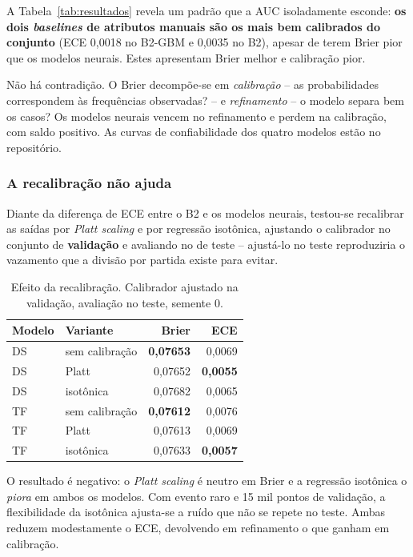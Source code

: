 \documentclass[12pt]{article}
\begin{document}
A Tabela~\ref{tab:resultados} revela um padrão que a AUC isoladamente esconde:
\textbf{os dois \emph{baselines} de atributos manuais são os mais bem calibrados
do conjunto} (ECE 0,0018 no B2-GBM e 0,0035 no B2), apesar de terem Brier pior
que os modelos neurais. Estes apresentam Brier melhor e calibração pior.

Não há contradição. O Brier decompõe-se em \emph{calibração} -- as probabilidades
correspondem às frequências observadas? -- e \emph{refinamento} -- o modelo separa
bem os casos? Os modelos neurais vencem no refinamento e perdem na calibração, com
saldo positivo. As curvas de confiabilidade dos quatro modelos estão no
repositório.

\subsubsection*{A recalibração não ajuda}

Diante da diferença de ECE entre o B2 e os modelos neurais, testou-se recalibrar
as saídas por \emph{Platt scaling} e por regressão isotônica, ajustando o
calibrador no conjunto de \textbf{validação} e avaliando no de teste --
ajustá-lo no teste reproduziria o vazamento que a divisão por partida existe
para evitar.

\begin{table}[ht]
\centering
\caption{Efeito da recalibração. Calibrador ajustado na validação, avaliação no
teste, semente 0.}
\label{tab:recal}
\begin{tabular}{@{}llrr@{}}
\toprule
Modelo & Variante & Brier & ECE \\
\midrule
DS & sem calibração & \textbf{0,07653} & 0,0069 \\
DS & Platt          & 0,07652 & \textbf{0,0055} \\
DS & isotônica      & 0,07682 & 0,0065 \\
\midrule
TF & sem calibração & \textbf{0,07612} & 0,0076 \\
TF & Platt          & 0,07613 & 0,0069 \\
TF & isotônica      & 0,07633 & \textbf{0,0057} \\
\bottomrule
\end{tabular}
\end{table}

O resultado é negativo: o \emph{Platt scaling} é neutro em Brier e a regressão
isotônica o \emph{piora} em ambos os modelos. Com evento raro e 15 mil pontos de
validação, a flexibilidade da isotônica ajusta-se a ruído que não se repete no
teste. Ambas reduzem modestamente o ECE, devolvendo em refinamento o que ganham
em calibração.
\end{document}
